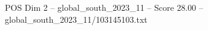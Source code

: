\begin{textsample}{POS Dim 2 – global\_south\_2023\_11 – Score 28.00 – global\_south\_2023\_11/103145103.txt}
\end{textsample}
